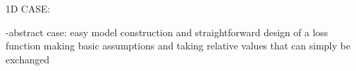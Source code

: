 	
	1D CASE:
	
				-abstract case: easy model construction and straightforward design of a loss function making basic assumptions and taking relative values that can simply be exchanged
			
